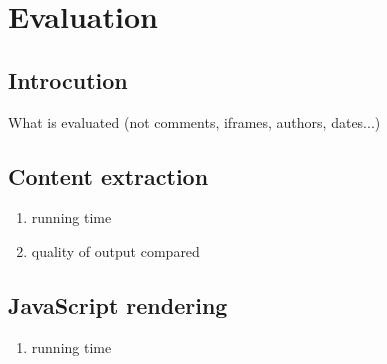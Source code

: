 \section{Evaluation}

\subsection{Introcution}
What is evaluated (not comments, iframes, authors, dates...)

\subsection{Content extraction}
\begin{enumerate}
  \item running time
  \item quality of output compared
\end{enumerate}

\subsection{JavaScript rendering}
\begin{enumerate}
  \item running time
\end{enumerate}
